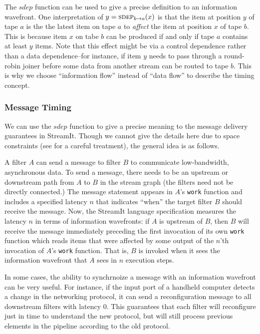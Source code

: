 The $sdep$ function can be used to give a precise definition to an
information wavefront.  One interpretation of $y = \mi{a}{b}(x)$ is
that the item at position $y$ of tape $a$ is the the latest item on
tape $a$ to {\it affect} the item at position $x$ of tape $b$.  This
is because item $x$ on tabe $b$ can be produced if and only if tape
$a$ contains at least $y$ items.  Note that this effect might be via a
control dependence rather than a data dependence--for instance, if
item $y$ needs to pass through a round-robin joiner before some data
from another stream can be routed to tape $b$.  This is why we choose
``information flow'' instead of ``data flow'' to describe the timing
concept.

\subsubsection{Message Timing}
\label{sec:messagesemantics}

We can use the $sdep$ function to give a precise meaning to the message
delivery guarantees in StreamIt.  Though we cannot give the details
here due to space constraints (see \cite{streamittech} for a careful
treatment), the general idea is as follows.

A filter $A$ can send a message to filter $B$ to communicate
low-bandwidth, asynchronous data.  To send a message, there needs to
be an upstream or downstream path from $A$ to $B$ in the stream graph
(the filters need not be directly connected.)  The message statement
appears in $A$'s {\tt work} function and includes a specified latency
$n$ that indicates ``when'' the target filter $B$ should receive the
message.  Now, the StreamIt language specification measures the
latency $n$ in terms of information wavefronts: if $A$ is upstream of
$B$, then $B$ will receive the message immediately preceding the first
invocation of its own {\tt work} function which reads items that were
affected by some output of the $n$'th invocation of $A$'s {\tt work}
function.  That is, $B$ is invoked when it sees the information
wavefront that $A$ sees in $n$ execution steps.

In some cases, the ability to synchrnoize a message with an
information wavefront can be very useful.  For instance, if the input
port of a handheld computer detects a change in the networking
protocol, it can send a reconfiguration message to all downstream
filters with latency 0.  This guarantees that each filter will
reconfigure just in time to understand the new protocol, but will
still process previous elements in the pipeline according to the old
protocol.

